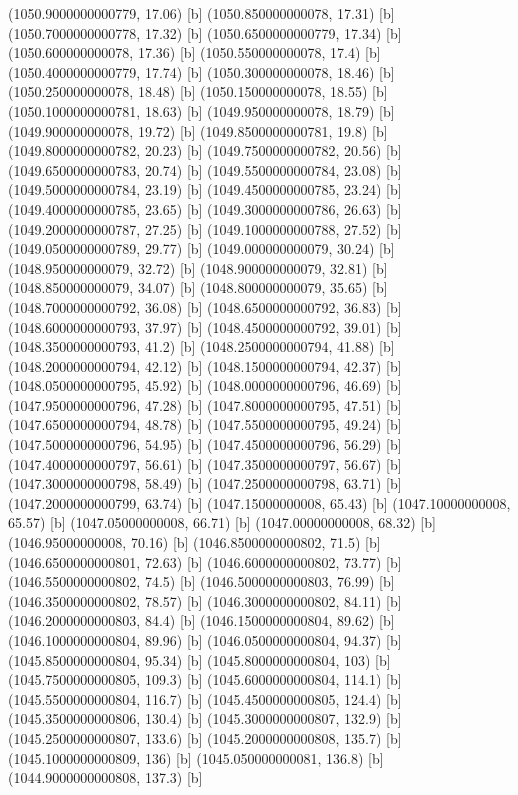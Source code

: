 {{{(1050.9000000000779, 17.06) [b] 
(1050.850000000078, 17.31) [b] 
(1050.7000000000778, 17.32) [b] 
(1050.6500000000779, 17.34) [b] 
(1050.600000000078, 17.36) [b] 
(1050.550000000078, 17.4) [b] 
(1050.4000000000779, 17.74) [b] 
(1050.300000000078, 18.46) [b] 
(1050.250000000078, 18.48) [b] 
(1050.150000000078, 18.55) [b] 
(1050.1000000000781, 18.63) [b] 
(1049.950000000078, 18.79) [b] 
(1049.900000000078, 19.72) [b] 
(1049.8500000000781, 19.8) [b] 
(1049.8000000000782, 20.23) [b] 
(1049.7500000000782, 20.56) [b] 
(1049.6500000000783, 20.74) [b] 
(1049.5500000000784, 23.08) [b] 
(1049.5000000000784, 23.19) [b] 
(1049.4500000000785, 23.24) [b] 
(1049.4000000000785, 23.65) [b] 
(1049.3000000000786, 26.63) [b] 
(1049.2000000000787, 27.25) [b] 
(1049.1000000000788, 27.52) [b] 
(1049.0500000000789, 29.77) [b] 
(1049.000000000079, 30.24) [b] 
(1048.950000000079, 32.72) [b] 
(1048.900000000079, 32.81) [b] 
(1048.850000000079, 34.07) [b] 
(1048.800000000079, 35.65) [b] 
(1048.7000000000792, 36.08) [b] 
(1048.6500000000792, 36.83) [b] 
(1048.6000000000793, 37.97) [b] 
(1048.4500000000792, 39.01) [b] 
(1048.3500000000793, 41.2) [b] 
(1048.2500000000794, 41.88) [b] 
(1048.2000000000794, 42.12) [b] 
(1048.1500000000794, 42.37) [b] 
(1048.0500000000795, 45.92) [b] 
(1048.0000000000796, 46.69) [b] 
(1047.9500000000796, 47.28) [b] 
(1047.8000000000795, 47.51) [b] 
(1047.6500000000794, 48.78) [b] 
(1047.5500000000795, 49.24) [b] 
(1047.5000000000796, 54.95) [b] 
(1047.4500000000796, 56.29) [b] 
(1047.4000000000797, 56.61) [b] 
(1047.3500000000797, 56.67) [b] 
(1047.3000000000798, 58.49) [b] 
(1047.2500000000798, 63.71) [b] 
(1047.2000000000799, 63.74) [b] 
(1047.15000000008, 65.43) [b] 
(1047.10000000008, 65.57) [b] 
(1047.05000000008, 66.71) [b] 
(1047.00000000008, 68.32) [b] 
(1046.95000000008, 70.16) [b] 
(1046.8500000000802, 71.5) [b] 
(1046.6500000000801, 72.63) [b] 
(1046.6000000000802, 73.77) [b] 
(1046.5500000000802, 74.5) [b] 
(1046.5000000000803, 76.99) [b] 
(1046.3500000000802, 78.57) [b] 
(1046.3000000000802, 84.11) [b] 
(1046.2000000000803, 84.4) [b] 
(1046.1500000000804, 89.62) [b] 
(1046.1000000000804, 89.96) [b] 
(1046.0500000000804, 94.37) [b] 
(1045.8500000000804, 95.34) [b] 
(1045.8000000000804, 103) [b] 
(1045.7500000000805, 109.3) [b] 
(1045.6000000000804, 114.1) [b] 
(1045.5500000000804, 116.7) [b] 
(1045.4500000000805, 124.4) [b] 
(1045.3500000000806, 130.4) [b] 
(1045.3000000000807, 132.9) [b] 
(1045.2500000000807, 133.6) [b] 
(1045.2000000000808, 135.7) [b] 
(1045.1000000000809, 136) [b] 
(1045.050000000081, 136.8) [b] 
(1044.9000000000808, 137.3) [b] 
}}}
